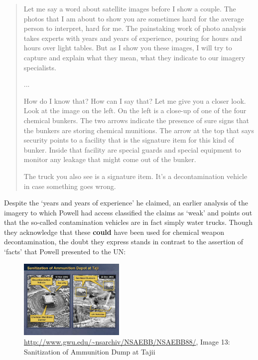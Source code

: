 \documentclass[11pt,oneside,notitlepage]{report}
\begin{document}
\begin{quote}
Let me say a word about satellite images before I show a couple. The photos that I am about to show you are sometimes hard for the average person to interpret, hard for me. The painstaking work of photo analysis takes experts with years and years of experience, pouring for hours and hours over light tables. But as I show you these images, I will try to capture and explain what they mean, what they indicate to our imagery specialists.

...

How do I know that? How can I say that? Let me give you a closer look. Look at the image on the left. On the left is a close-up of one of the four chemical bunkers. The two arrows indicate the presence of sure signs that the bunkers are storing chemical munitions. The arrow at the top that says security points to a facility that is the signature item for this kind of bunker. Inside that facility are special guards and special equipment to monitor any leakage that might come out of the bunker.

The truck you also see is a signature item. It's a decontamination vehicle in case something goes wrong.
\cite{guardian2003powell}
\end{quote}

Despite the `years and years of experience' he claimed, an earlier analysis of the imagery to which Powell had access classified the claims as `weak' and points out that the so-called contamination vehicles are in fact simply water trucks. Though they acknowledge that these \textbf{could} have been used for chemical weapon decontamination, the doubt they express stands in contrast to the assertion of `facts' that Powell presented to the UN: 

\begin{figure}
	\begin{flushright}
		\includegraphics[width=0.45\textwidth]{images/iraq-image-13.jpg}
		\url{http://www.gwu.edu/~nsarchiv/NSAEBB/NSAEBB88/}, Image 13: Sanitization of Ammunition Dump at Tajii	
	\end{flushright}
\end{figure}
\end{document}
